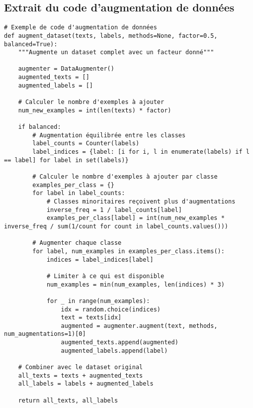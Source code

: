 \documentclass[a4paper,11pt]{article}
\begin{document}
\subsection{Extrait du code d'augmentation de données}
\begin{lstlisting}[caption=Augmentation de données]
# Exemple de code d'augmentation de données
def augment_dataset(texts, labels, methods=None, factor=0.5, balanced=True):
    """Augmente un dataset complet avec un facteur donné"""
    
    augmenter = DataAugmenter()
    augmented_texts = []
    augmented_labels = []
    
    # Calculer le nombre d'exemples à ajouter
    num_new_examples = int(len(texts) * factor)
    
    if balanced:
        # Augmentation équilibrée entre les classes
        label_counts = Counter(labels)
        label_indices = {label: [i for i, l in enumerate(labels) if l == label] for label in set(labels)}
        
        # Calculer le nombre d'exemples à ajouter par classe
        examples_per_class = {}
        for label in label_counts:
            # Classes minoritaires reçoivent plus d'augmentations
            inverse_freq = 1 / label_counts[label]
            examples_per_class[label] = int(num_new_examples * inverse_freq / sum(1/count for count in label_counts.values()))
        
        # Augmenter chaque classe
        for label, num_examples in examples_per_class.items():
            indices = label_indices[label]
            
            # Limiter à ce qui est disponible
            num_examples = min(num_examples, len(indices) * 3)
            
            for _ in range(num_examples):
                idx = random.choice(indices)
                text = texts[idx]
                augmented = augmenter.augment(text, methods, num_augmentations=1)[0]
                augmented_texts.append(augmented)
                augmented_labels.append(label)
    
    # Combiner avec le dataset original
    all_texts = texts + augmented_texts
    all_labels = labels + augmented_labels
    
    return all_texts, all_labels
\end{lstlisting}
\end{document}
